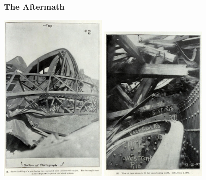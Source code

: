 \begin{frame}
\frametitle{The Aftermath}

\begin{center}
 \includegraphics[width=0.4\textwidth]{images/collapse5}
 \includegraphics[width=0.4\textwidth]{images/collapse6}
\end{center}

\end{frame}



